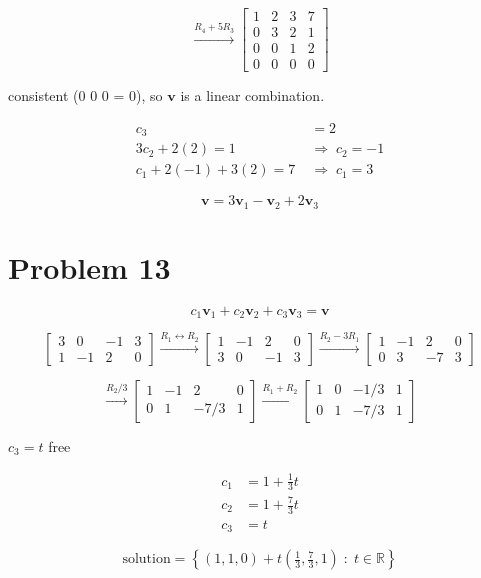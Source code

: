 \documentclass{article}
\begin{document}
\[
\xrightarrow{R_4 + 5R_3}
\left[\begin{array}{ccc|c}
1 & 2 & 3 & 7 \\
0 & 3 & 2 & 1 \\
0 & 0 & 1 & 2 \\
0 & 0 & 0 & 0
\end{array}\right]
\]

consistent (0 0 0 = 0), so $\mathbf{v}$ is a linear combination.

\begin{align*}
c_3 &= 2 \\
3c_2 + 2(2) = 1 \;&\Rightarrow\; c_2 = -1 \\
c_1 + 2(-1) + 3(2) = 7 \;&\Rightarrow\; c_1 = 3
\end{align*}

\[
\boxed{\mathbf{v} = 3\mathbf{v}_1 - \mathbf{v}_2 + 2\mathbf{v}_3}
\]

\section*{Problem 13}

\[
c_1\mathbf{v}_1 + c_2\mathbf{v}_2 + c_3\mathbf{v}_3 = \mathbf{v}
\]

\[
\left[\begin{array}{ccc|c}
3 & 0 & -1 & 3 \\
1 & -1 & 2 & 0
\end{array}\right]
\xrightarrow{R_1 \leftrightarrow R_2}
\left[\begin{array}{ccc|c}
1 & -1 & 2 & 0 \\
3 & 0 & -1 & 3
\end{array}\right]
\xrightarrow{R_2 - 3R_1}
\left[\begin{array}{ccc|c}
1 & -1 & 2 & 0 \\
0 & 3 & -7 & 3
\end{array}\right]
\]

\[
\xrightarrow{R_2 / 3}
\left[\begin{array}{ccc|c}
1 & -1 & 2 & 0 \\
0 & 1 & -7/3 & 1
\end{array}\right]
\xrightarrow{R_1 + R_2}
\left[\begin{array}{ccc|c}
1 & 0 & -1/3 & 1 \\
0 & 1 & -7/3 & 1
\end{array}\right]
\]

$c_3 = t$ free

\begin{align*}
c_1 &= 1 + \tfrac{1}{3}t \\
c_2 &= 1 + \tfrac{7}{3}t \\
c_3 &= t
\end{align*}

\[
\boxed{
\text{solution} = \left\{ (1,1,0) + t\left(\tfrac{1}{3}, \tfrac{7}{3}, 1\right) \;:\; t \in \mathbb{R} \right\}
}
\]
\end{document}
